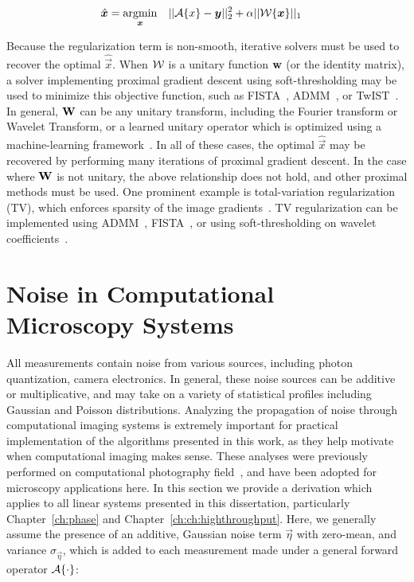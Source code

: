 \begin{equation}\label{eq:intro_sparse}
\begin{aligned}
& \hat{\bm{x}} = \underset{\bm{x}}{\text{argmin}}
& & ||\mathcal{A}\{x\}-\bm{y} ||_2^2 + \alpha||\mathcal{W}\{\bm{x}\}||_1
\end{aligned}
\end{equation}

Because the regularization term is non-smooth, iterative solvers must be used to recover the optimal $\hat{\vec{x}}$. When $\mathcal{W}$ is a unitary function $\mathbf{w}$ (or the identity matrix), a solver implementing proximal gradient descent using soft-thresholding may be used to minimize this objective function, such as FISTA~\cite{beck2009fast}, ADMM~\cite{boyd2011distributed}, or TwIST~\cite{bioucas2007new}. In general, $\mathbf{W}$ can be any unitary transform, including the Fourier transform  or Wavelet Transform, or a learned unitary operator which is optimized using a machine-learning framework~\cite{ravishankar2013learning}. In all of these cases, the optimal $\hat{\vec{x}}$ may be recovered by performing many iterations of proximal gradient descent. In the case where $\mathbf{W}$ is not unitary, the above relationship does not hold, and other proximal methods must be used. One prominent example is total-variation regularization (TV), which enforces sparsity of the image gradients~\cite{rudin1992nonlinear}. TV regularization can be implemented using ADMM~\cite{wahlberg2012admm}, FISTA~\cite{beck2009fast}, or using soft-thresholding on wavelet coefficients~\cite{kamilov2012wavelet}.

\section{Noise in Computational Microscopy Systems}\label{sec:intro_noise}
All measurements contain noise from various sources, including photon quantization, camera electronics. In general, these noise sources can be additive or multiplicative, and may take on a variety of statistical profiles including Gaussian and Poisson distributions. Analyzing the propagation of noise through computational imaging systems is extremely important for practical implementation of the algorithms presented in this work, as they help motivate when computational imaging makes sense. These analyses were previously performed on computational photography field~\cite{cossairt2013does}, and have been adopted for microscopy applications here. In this section we provide a derivation which applies to all linear systems presented in this dissertation, particularly Chapter~\ref{ch:phase} and Chapter~\ref{ch:ch:highthroughput}. Here, we generally assume the presence of an additive, Gaussian noise term $\vec{\eta}$ with zero-mean, and variance $\sigma_{\vec{\eta}}$, which is added to each measurement made under a general forward operator $\mathcal{A}\{\cdot\}$:

